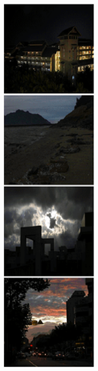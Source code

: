 \documentclass[CJK,aspectratio=169]{beamer}  %
\begin{document}
\begin{frame}
\begin{figure}
\begin{minipage}{.08\paperwidth}
			\includegraphics[width=\linewidth]{picture/LLIE/LightingNet/LOW}

\end{minipage}
\end{figure}
\end{frame}
\end{document}
